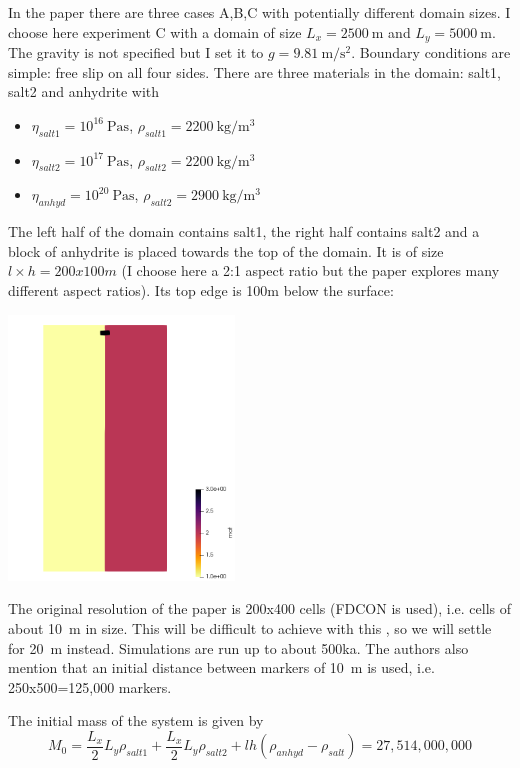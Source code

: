 In the paper there are three cases A,B,C with potentially different domain sizes.
I choose here experiment C with a domain of size $L_x=2500~\si{\meter}$
and $L_y=5000~\si{\meter}$. The gravity is not specified but I set it to 
$g=9.81~\si{\meter\per\square\second}$.
Boundary conditions are simple: free slip on all four sides.
There are three materials in the domain: salt1, salt2 and anhydrite
with 
\begin{itemize}
\item $\eta_{salt1}=10^{16}~\si{\pascal\second}$, $\rho_{salt1}=2200~\si{\kg\per\cubic\meter}$
\item $\eta_{salt2}=10^{17}~\si{\pascal\second}$, $\rho_{salt2}=2200~\si{\kg\per\cubic\meter}$
\item $\eta_{anhyd}=10^{20}~\si{\pascal\second}$, $\rho_{salt2}=2900~\si{\kg\per\cubic\meter}$
\end{itemize}
The left half of the domain contains salt1, the right half contains salt2 and 
a block of anhydrite is placed towards the top of the domain. 
It is of size $l\times h=200x100m$ (I choose here a 2:1 aspect ratio but the paper 
explores many different aspect ratios). Its top edge is 100m below the surface:

\begin{center}
\includegraphics[width=6cm]{python_codes/fieldstone_67/results/buks12/setup}
\end{center}

The original resolution of the paper is 200x400 cells (FDCON is used),
i.e. cells of about 10~m in size.
This will be difficult to achieve with this \stone, so we will settle for 20~m
instead.
Simulations are run up to about 500ka.
The authors also mention that an initial distance between markers of 10~m is 
used, i.e. 250x500=125,000 markers.

The initial mass of the system is given by 
\[
M_0 = 
\frac{L_x}{2} L_y \rho_{salt1}
+
\frac{L_x}{2} L_y \rho_{salt2}
+
l h (\rho_{anhyd}-\rho_{salt})
=27,514,000,000
\]




 


















